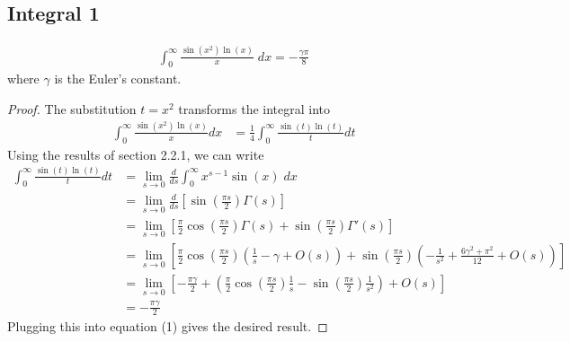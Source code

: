 \subsection{Integral 1}
\begin{align*}
\int_0^\infty \frac{\sin\left( x^2\right)\ln(x)}{x} \; dx = -\frac{\gamma \pi}{8}
\end{align*}
where $\gamma$ is the Euler's constant.
\begin{proof}
The substitution $t=x^2$ transforms the integral into
\begin{align*}
\int_0^\infty \frac{\sin\left(x^2\right)\ln(x)}{x}dx &= \frac{1}{4}\int_0^\infty \frac{\sin(t) \ln(t)}{t}dt \tag{1}
\end{align*}
Using the results of section 2.2.1, we can write
\begin{align*}
\int_0^\infty \frac{\sin(t)\ln(t)}{t}dt &= \lim_{s\to 0}\frac{d}{ds}\int_0^\infty x^{s-1} \sin(x)\; dx\\
&= \lim_{s\to 0} \frac{d}{ds}\left[\sin\left(\frac{\pi s}{2}\right) \Gamma(s)\right] \\
&= \lim_{s\to 0} \left[ \frac{\pi}{2}\cos\left(\frac{\pi s}{2}\right)\Gamma(s) + \sin\left(\frac{\pi s}{2}\right)\Gamma'(s)\right] \\
&= \lim_{s\to 0} \left[ \frac{\pi}{2}\cos\left(\frac{\pi s}{2}\right)\left(\frac{1}{s}-\gamma+O(s) \right) + \sin\left(\frac{\pi s}{2}\right)\left(-\frac{1}{s^2}+\frac{6\gamma^2+\pi^2}{12}+O(s) \right) \right] \\
&= \lim_{s\to 0} \left[-\frac{\pi \gamma}{2} + \left( \frac{\pi}{2}\cos\left(\frac{\pi s}{2}\right) \frac{1}{s} - \sin\left(\frac{\pi s}{2}\right)\frac{1}{s^2}\right) + O(s)\right]\\
&= -\frac{\pi \gamma}{2} \tag{2}
\end{align*}
Plugging this into equation (1) gives the desired result.
\end{proof}

